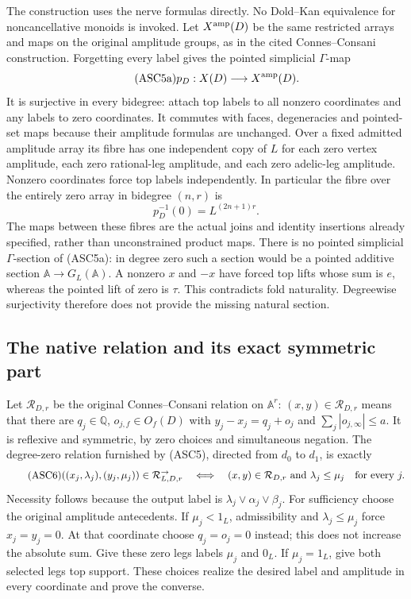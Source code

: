 The construction uses the nerve formulas directly. No Dold--Kan
equivalence for noncancellative monoids is invoked. Let $X^{\rm amp}(D)$
be the same restricted arrays and maps on the original amplitude
groups, as in the cited Connes--Consani construction. Forgetting every
label gives the pointed simplicial $\Gamma$-map
\begin{equation}\tag{ASC5a}
p_D:X(D)\longrightarrow X^{\rm amp}(D).
\end{equation}
It is surjective in every bidegree: attach top labels to all nonzero
coordinates and any labels to zero coordinates. It commutes with
faces, degeneracies and pointed-set maps because their amplitude
formulas are unchanged. Over a fixed admitted amplitude array its
fibre has one independent copy of $L$ for each zero vertex amplitude,
each zero rational-leg amplitude, and each zero adelic-leg amplitude.
Nonzero coordinates force top labels independently. In particular
the fibre over the entirely zero array in bidegree $(n,r)$ is
\begin{equation}\tag{ASC5b}
p_D^{-1}(0)=L^{(2n+1)r}.
\end{equation}
The maps between these fibres are the actual joins and identity
insertions already specified, rather than unconstrained product maps.
There is no pointed simplicial $\Gamma$-section of (ASC5a): in degree
zero such a section would be a pointed additive section
$\mathbb A\to G_L(\mathbb A)$. A nonzero $x$ and $-x$ have forced
top lifts whose sum is $e$, whereas the pointed lift of zero is
$\tau$. This contradicts fold naturality. Degreewise surjectivity
therefore does not provide the missing natural section.

\subsection{The native relation and its exact symmetric part}

Let $\mathcal R_{D,r}$ be the original Connes--Consani relation
on $\mathbb A^r$: $(x,y)\in\mathcal R_{D,r}$ means that there
are $q_j\in\mathbb Q$, $o_{j,f}\in O_f(D)$ with
$y_j-x_j=q_j+o_j$ and $\sum_j|o_{j,\infty}|\le a$.
It is reflexive and symmetric, by zero choices and simultaneous
negation. The degree-zero relation furnished by (ASC5), directed
from $d_0$ to $d_1$, is exactly
\begin{equation}\tag{ASC6}
\begin{split}
((x_j,\lambda_j),(y_j,\mu_j))\in\mathcal R^{\to}_{L,D,r}
\quad\Longleftrightarrow\quad
(x,y)\in\mathcal R_{D,r}\ \text{and}\
\lambda_j\le\mu_j\quad\hbox{for every }j.
\end{split}
\end{equation}
Necessity follows because the output label is
$\lambda_j\vee\alpha_j\vee\beta_j$.
For sufficiency choose the original amplitude antecedents. If
$\mu_j<1_L$, admissibility and $\lambda_j\le\mu_j$ force
$x_j=y_j=0$. At that coordinate choose $q_j=o_j=0$ instead;
this does not increase the absolute sum. Give these zero legs
labels $\mu_j$ and $0_L$. If $\mu_j=1_L$, give both selected
legs top support. These choices realize the desired label and
amplitude in every coordinate and prove the converse.

